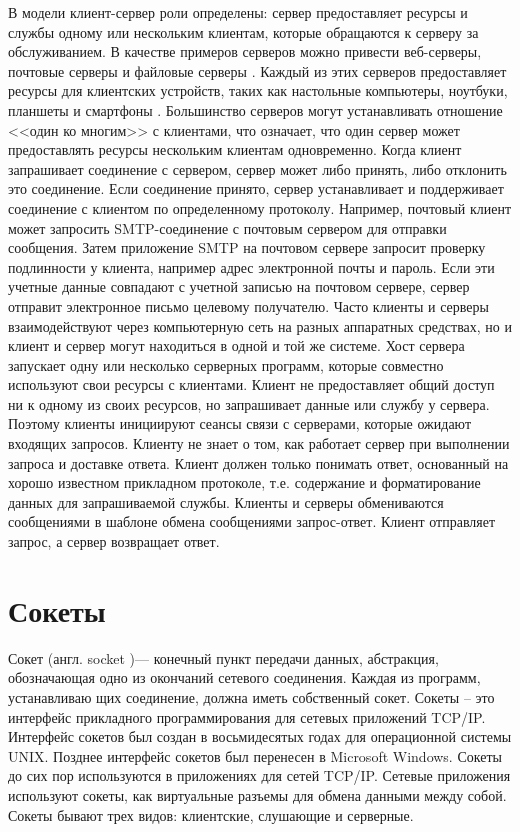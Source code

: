 В модели клиент-сервер роли определены: сервер предоставляет ре­сурсы и службы одному или нескольким клиентам, которые обращаются к серверу за обслуживанием. В качестве примеров серверов можно привести веб­-серверы, почтовые серверы и файловые серверы . Каждый из этих серверов предоставляет ресурсы для клиентских устройств, таких как настольные ком­пьютеры, ноутбуки, планшеты и смартфоны . Большинство серверов могут устанавливать отношение <<один ко многим>> с клиентами, что означает, что один сервер может предоставлять ресурсы нескольким клиентам одновремен­но. Когда клиент запрашивает соединение с сервером, сервер может либо принять, либо отклонить это соединение. Если соединение принято, сервер устанавливает и поддерживает соединение с клиентом по определенному про­токолу. Например, почтовый клиент может запросить SMTP-соединение с почтовым сервером для отправки сообщения. Затем приложение SMTP на почтовом сервере запросит проверку подлинности у клиента, например адрес электронной почты и пароль. Если эти учетные данные совпадают с учетной записью на почтовом сервере, сервер отправит электронное письмо целевому получателю. Часто клиенты и серверы взаимодействуют через компьютерную сеть на разных аппаратных средствах, но и клиент и сервер могут находиться в одной и той же системе. Хост сервера запускает одну или несколько серверных программ, которые совместно используют свои ресурсы с клиентами. Клиент не предоставляет общий доступ ни к одному из своих ресурсов, но запраши­вает данные или службу у сервера. Поэтому клиенты инициируют сеансы связи с серверами, которые ожидают входящих запросов. Клиенту не знает о том, как работает сервер при выполнении запроса и доставке ответа. Клиент должен только понимать ответ, основанный на хорошо известном прикладном протоколе, т.е. содержание и форматирование данных для запрашиваемой службы. Клиенты и серверы обмениваются сообщениями в шаблоне обмена сообщениями запрос-ответ. Клиент отправляет запрос, а сервер возвращает ответ.

\section{Сокеты}

Сокет (англ. socket \cite{socket})— конечный пункт передачи данных, абстракция, обозначающая одно из окончаний сетевого соединения. Каждая из программ, устанавливаю­ щих соединение, должна иметь собственный сокет. Сокеты – это интерфейс прикладного программирования для сетевых приложений TCP/IP. Интерфейс сокетов был создан в восьмидесятых годах для операционной системы UNIX. Позднее интерфейс сокетов был перенесен в Microsoft Windows. Сокеты до сих пор используются в приложениях для сетей TCP/IP. Сетевые приложения используют сокеты, как виртуальные разъемы для обмена данными между собой. Сокеты бывают трех видов: клиентские, слушающие и серверные.

